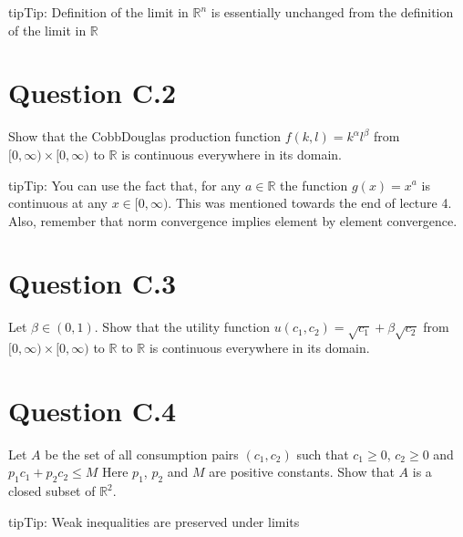 \documentclass[letterpaper,10pt,english]{jupyterBook}
\begin{document}
\begin{sphinxadmonition}{tip}{Tip:}
\sphinxAtStartPar
Definition of the limit in \(\mathbb{R}^n\) is essentially unchanged from the definition of the limit in \(\mathbb{R}\)
\end{sphinxadmonition}


\section{Question C.2}
\label{\detokenize{04.exercises.C:question-c-2}}
\sphinxAtStartPar
Show that the Cobb\sphinxhyphen{}Douglas production function
\(f(k,l) = k^\alpha l^\beta\) from \([0,\infty) \times [0,\infty)\) to \(\mathbb{R}\) is continuous everywhere in its domain.

\begin{sphinxadmonition}{tip}{Tip:}
\sphinxAtStartPar
You can use the fact that, for any \(a \in \mathbb{R}\) the function \(g(x) = x^a\) is continuous at any \(x \in [0,\infty)\). This was mentioned towards the end of lecture 4.
Also, remember that norm convergence implies element by element convergence.
\end{sphinxadmonition}


\section{Question C.3}
\label{\detokenize{04.exercises.C:question-c-3}}
\sphinxAtStartPar
Let \(\beta \in (0,1)\). Show that the utility function \(u(c_1,c_2) = \sqrt{c_1} + \beta \sqrt{c_2}\) from \([0,\infty) \times [0,\infty)\) to \(\mathbb{R}\) to \(\mathbb{R}\) is continuous everywhere in its domain.


\section{Question C.4}
\label{\detokenize{04.exercises.C:question-c-4}}
\sphinxAtStartPar
Let \(A\) be the set of all consumption pairs \((c_1,c_2)\) such that \(c_1 \ge 0\), \(c_2 \ge 0\) and \(p_1 c_1 + p_2 c_2 \le M\) Here \(p_1\), \(p_2\) and \(M\) are positive constants. Show that \(A\) is a closed subset of \(\mathbb{R}^2\).

\begin{sphinxadmonition}{tip}{Tip:}
\sphinxAtStartPar
Weak inequalities are preserved under limits
\end{sphinxadmonition}
\end{document}
